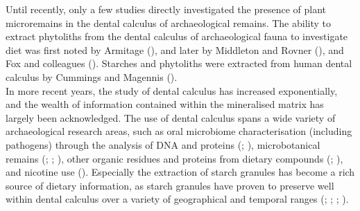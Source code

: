 \documentclass[
  b5paper,
]{book}
\begin{document}
Until recently, only a few studies directly investigated the presence of
plant microremains in the dental calculus of archaeological remains. The
ability to extract phytoliths from the dental calculus of archaeological
fauna to investigate diet was first noted by Armitage
(), and later
by Middleton and Rovner
(), and Fox and
colleagues (). Starches and
phytoliths were extracted from human dental calculus by Cummings and
Magennis ().\\
In more recent years, the study of dental calculus has increased
exponentially, and the wealth of information contained within the
mineralised matrix has largely been acknowledged. The use of dental
calculus spans a wide variety of archaeological research areas, such as
oral microbiome characterisation (including pathogens) through the
analysis of DNA and proteins
(;
), microbotanical remains
(;
;
), other organic residues and proteins from dietary compounds
(;
), and
nicotine use (). Especially the extraction of starch granules has become a rich
source of dietary information, as starch granules have proven to
preserve well within dental calculus over a variety of geographical and
temporal ranges (; ; ; ).
\end{document}
